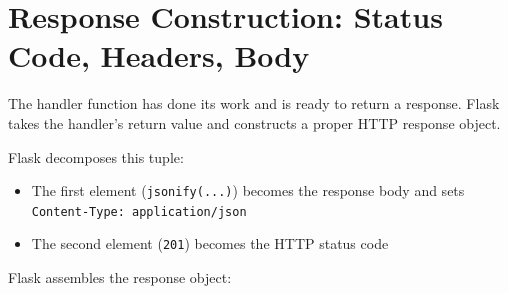 \setcounter{section}{8}
\section{Response Construction: Status Code, Headers, Body}\label{05-internal-request-execution:59-response-construction-status-code-headers-body}

The handler function has done its work and is ready to return a response. Flask takes the handler's return value and constructs a proper HTTP response object.

\begin{codebox}[short]

\begin{Shaded}
\begin{Highlighting}[]
\NormalTok{: }\NormalTok{, }\NormalTok{: }\NormalTok{\}), }
\end{Highlighting}
\end{Shaded}

\end{codebox}

\noindent{}Flask decomposes this tuple:

\begin{itemize}
\tightlist
\item
  The first element (\texttt{jsonify(...)}) becomes the response body and sets \texttt{Content-}\allowbreak{}\texttt{Type:}\allowbreak{}\texttt{\ application/}\allowbreak{}\texttt{json}
\item
  The second element (\texttt{201}) becomes the HTTP status code
\end{itemize}

\noindent{}Flask assembles the response object:

\begin{codebox}[short]

\begin{Shaded}
\begin{Highlighting}[]
\OperatorTok{=}
\OperatorTok{=}\StringTok{\textquotesingle{}}\NormalTok{,   }
\OperatorTok{=}\NormalTok{,}
\OperatorTok{=}\NormalTok{\{}
        \NormalTok{: }\NormalTok{,}
        \NormalTok{: }\NormalTok{,}
\NormalTok{    \}}
\NormalTok{)}
\end{Highlighting}
\end{Shaded}

\end{codebox}

